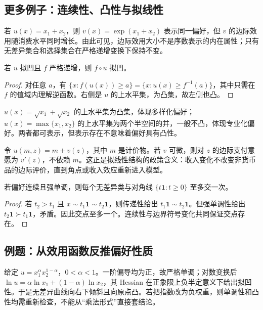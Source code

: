\subsection{更多例子：连续性、凸性与拟线性}

\begin{example}[线性效用的表示不唯一]
若 $u(x)=x_1+x_2$，则 $v(x)=\exp(x_1+x_2)$ 表示同一偏好，但 $v$ 的边际效用随消费水平同时增长。由此可见，边际效用大小不是序数表示的内在属性；只有无差异集合和选择集合在严格递增变换下保持不变。
\end{example}

\begin{proposition}[严格单调变换保持拟凹性]
若 $u$ 拟凹且 $f$ 严格递增，则 $f\circ u$ 拟凹。
\end{proposition}
\begin{proof}
对任意 $a$，有
$\{x:f(u(x))\ge a\}=\{x:u(x)\ge f^{-1}(a)\}$，其中只需在 $f$ 的值域内理解逆函数。右侧是 $u$ 的上水平集，为凸集，故左侧也凸。
\end{proof}

\begin{example}[凸偏好与非凸偏好]
$u(x)=\sqrt{x_1}+\sqrt{x_2}$ 的上水平集为凸集，体现多样化偏好；$u(x)=\max\{x_1,x_2\}$ 的上水平集为两个半空间的并，一般不凸，体现专业化偏好。两者都可表示，但表示存在不意味着偏好具有凸性。
\end{example}

\begin{example}[拟线性效用]
令 $u(m,z)=m+v(z)$，其中 $m$ 是计价物。若 $v$ 可微，则对 $z$ 的边际支付意愿为 $v'(z)$，不依赖 $m$。这正是拟线性结构的政策含义：收入变化不改变非货币品的边际评价，直到角点或收入效应重新进入模型。
\end{example}

\begin{proposition}[对角线编号的唯一性]
若偏好连续且强单调，则每个无差异类与对角线 $\{t\mathbf 1:t\ge0\}$ 至多交一次。
\end{proposition}
\begin{proof}
若 $t_2>t_1$ 且 $x\sim t_1\mathbf1\sim t_2\mathbf1$，则传递性给出 $t_1\mathbf1\sim t_2\mathbf1$。但强单调性给出 $t_2\mathbf1\succ t_1\mathbf1$，矛盾。因此交点至多一个。连续性与边界符号变化共同保证交点存在。
\end{proof}

\subsection{例题：从效用函数反推偏好性质}
给定 $u=x_1^\alpha x_2^{1-\alpha}$，$0<\alpha<1$。一阶偏导均为正，故严格单调；对数变换后 $\ln u=\alpha\ln x_1+(1-\alpha)\ln x_2$，其 Hessian 在正象限上负半定意义下给出拟凹性。于是无差异曲线向右下倾斜且向原点凸。若把指数改为负权重，则单调性和凸性均需重新检查，不能从“乘法形式”直接套结论。
